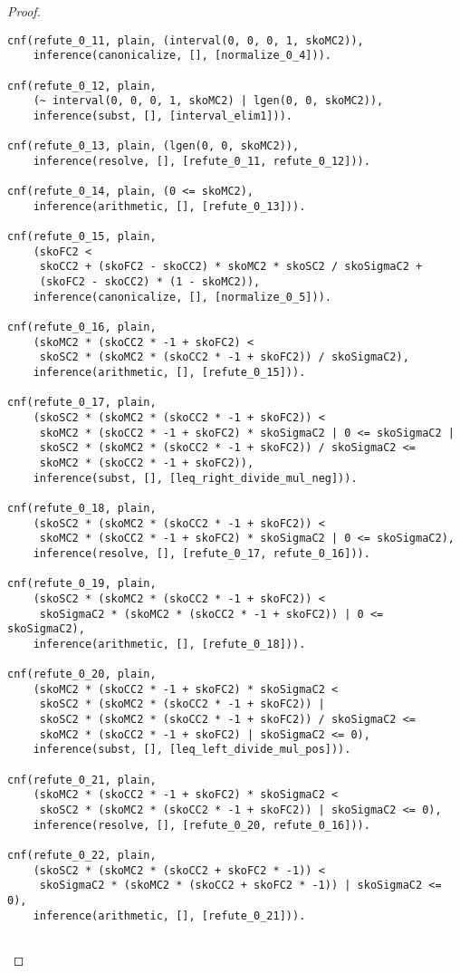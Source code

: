 \begin{proof}
\begin{verbatim}
cnf(refute_0_11, plain, (interval(0, 0, 0, 1, skoMC2)),
    inference(canonicalize, [], [normalize_0_4])).

cnf(refute_0_12, plain,
    (~ interval(0, 0, 0, 1, skoMC2) | lgen(0, 0, skoMC2)),
    inference(subst, [], [interval_elim1])).

cnf(refute_0_13, plain, (lgen(0, 0, skoMC2)),
    inference(resolve, [], [refute_0_11, refute_0_12])).

cnf(refute_0_14, plain, (0 <= skoMC2),
    inference(arithmetic, [], [refute_0_13])).

cnf(refute_0_15, plain,
    (skoFC2 <
     skoCC2 + (skoFC2 - skoCC2) * skoMC2 * skoSC2 / skoSigmaC2 +
     (skoFC2 - skoCC2) * (1 - skoMC2)),
    inference(canonicalize, [], [normalize_0_5])).

cnf(refute_0_16, plain,
    (skoMC2 * (skoCC2 * -1 + skoFC2) <
     skoSC2 * (skoMC2 * (skoCC2 * -1 + skoFC2)) / skoSigmaC2),
    inference(arithmetic, [], [refute_0_15])).

cnf(refute_0_17, plain,
    (skoSC2 * (skoMC2 * (skoCC2 * -1 + skoFC2)) <
     skoMC2 * (skoCC2 * -1 + skoFC2) * skoSigmaC2 | 0 <= skoSigmaC2 |
     skoSC2 * (skoMC2 * (skoCC2 * -1 + skoFC2)) / skoSigmaC2 <=
     skoMC2 * (skoCC2 * -1 + skoFC2)),
    inference(subst, [], [leq_right_divide_mul_neg])).

cnf(refute_0_18, plain,
    (skoSC2 * (skoMC2 * (skoCC2 * -1 + skoFC2)) <
     skoMC2 * (skoCC2 * -1 + skoFC2) * skoSigmaC2 | 0 <= skoSigmaC2),
    inference(resolve, [], [refute_0_17, refute_0_16])).

cnf(refute_0_19, plain,
    (skoSC2 * (skoMC2 * (skoCC2 * -1 + skoFC2)) <
     skoSigmaC2 * (skoMC2 * (skoCC2 * -1 + skoFC2)) | 0 <= skoSigmaC2),
    inference(arithmetic, [], [refute_0_18])).

cnf(refute_0_20, plain,
    (skoMC2 * (skoCC2 * -1 + skoFC2) * skoSigmaC2 <
     skoSC2 * (skoMC2 * (skoCC2 * -1 + skoFC2)) |
     skoSC2 * (skoMC2 * (skoCC2 * -1 + skoFC2)) / skoSigmaC2 <=
     skoMC2 * (skoCC2 * -1 + skoFC2) | skoSigmaC2 <= 0),
    inference(subst, [], [leq_left_divide_mul_pos])).

cnf(refute_0_21, plain,
    (skoMC2 * (skoCC2 * -1 + skoFC2) * skoSigmaC2 <
     skoSC2 * (skoMC2 * (skoCC2 * -1 + skoFC2)) | skoSigmaC2 <= 0),
    inference(resolve, [], [refute_0_20, refute_0_16])).

cnf(refute_0_22, plain,
    (skoSC2 * (skoMC2 * (skoCC2 + skoFC2 * -1)) <
     skoSigmaC2 * (skoMC2 * (skoCC2 + skoFC2 * -1)) | skoSigmaC2 <= 0),
    inference(arithmetic, [], [refute_0_21])).


\end{verbatim}
\end{proof}
